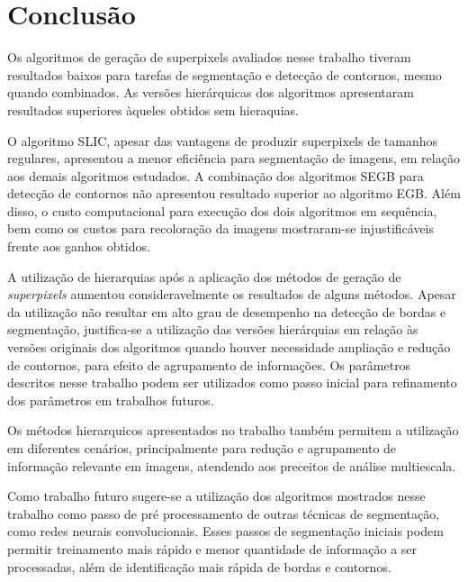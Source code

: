 \begin{document}


\section{Conclusão} \label{sec:conclusao}

Os algoritmos de geração de superpixels avaliados nesse trabalho tiveram resultados baixos para tarefas de segmentação e detecção de contornos, mesmo quando combinados. As versões hierárquicas dos algoritmos apresentaram resultados superiores àqueles obtidos sem hieraquias.

O algoritmo SLIC, apesar das vantagens de produzir superpixels de tamanhos regulares, apresentou a menor eficiência para segmentação de imagens, em relação aos demais algoritmos estudados. A combinação dos algoritmos SEGB para detecção de contornos não apresentou resultado   superior ao algoritmo EGB. Além disso, o custo computacional para execução dos dois algoritmos em sequência, bem como os custos para recoloração da imagens mostraram-se injustificáveis frente aos ganhos obtidos.

A utilização de hierarquias após a aplicação dos métodos de geração de \textit{superpixels} aumentou consideravelmente os resultados de alguns métodos. Apesar da utilização não resultar em alto grau de desempenho na detecção de bordas e segmentação, justifica-se a utilização das versões hierárquias em relação às versões originais dos algoritmos quando houver necessidade ampliação e redução de contornos, para efeito de agrupamento de informações. Os parâmetros descritos nesse trabalho podem ser utilizados como passo inicial para refinamento dos parâmetros em trabalhos futuros.

Os métodos hierarquicos apresentados no trabalho também permitem a utilização em diferentes cenários, principalmente para redução e agrupamento de informação relevante em imagens, atendendo aos preceitos de análise multiescala.

Como trabalho futuro sugere-se a utilização dos algoritmos mostrados nesse trabalho como passo de pré processamento de outras técnicas de segmentação, como redes neurais convolucionais. Esses passos de segmentação iniciais podem permitir treinamento mais rápido e menor quantidade de informação a ser processadas, além de identificação mais rápida de bordas e contornos.




\end{document}
